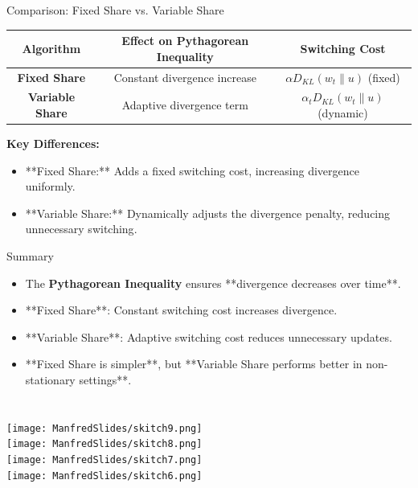 \documentclass[handout]{beamer}
\begin{document}
\begin{frame}{Comparison: Fixed Share vs. Variable Share}
\begin{table}[]
\centering
\begin{tabular}{|c|c|c|}
\hline
\textbf{Algorithm}  & \textbf{Effect on Pythagorean Inequality} & \textbf{Switching Cost} \\ \hline
\textbf{Fixed Share}  & Constant divergence increase & \( \alpha D_{KL}(w_t \| u) \) (fixed) \\ \hline
\textbf{Variable Share} & Adaptive divergence term & \( \alpha_t D_{KL}(w_t \| u) \) (dynamic) \\ \hline
\end{tabular}
\end{table}

\textbf{Key Differences:}
\begin{itemize}
    \item **Fixed Share:** \textcolor{mathcolor}{Adds a fixed switching cost, increasing divergence uniformly}.
    \item **Variable Share:** \textcolor{mathcolor}{Dynamically adjusts the divergence penalty, reducing unnecessary switching}.
\end{itemize}
\end{frame}

\begin{frame}{Summary}
\begin{itemize}
    \item The \textbf{Pythagorean Inequality} ensures **divergence decreases over time**.
    \item **Fixed Share**: \textcolor{mathcolor}{Constant switching cost increases divergence}.
    \item **Variable Share**: \textcolor{mathcolor}{Adaptive switching cost reduces unnecessary updates}.
    \item **Fixed Share is simpler**, but **Variable Share performs better in non-stationary settings**.
\end{itemize}
\end{frame}

%




\section{}
\texttt{[image: ManfredSlides/skitch9.png]}\\
\texttt{[image: ManfredSlides/skitch8.png]}\\
\texttt{[image: ManfredSlides/skitch7.png]}\\
\texttt{[image: ManfredSlides/skitch6.png]}
\end{document}
